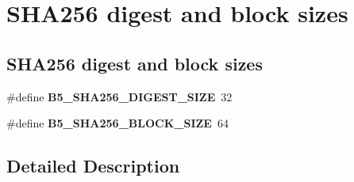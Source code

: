 \hypertarget{group__sha_size}{\section{S\-H\-A256 digest and block sizes}
\label{group__sha_size}
}
\subsection*{S\-H\-A256 digest and block sizes}
\begin{DoxyCompactItemize}
\item 
\hypertarget{group__sha_size_gae5dc0a994edcc288f44190752f534788}{\#define {\bfseries B5\-\_\-\-S\-H\-A256\-\_\-\-D\-I\-G\-E\-S\-T\-\_\-\-S\-I\-Z\-E}~32}\label{group__sha_size_gae5dc0a994edcc288f44190752f534788}

\item 
\hypertarget{group__sha_size_ga1997723ab4346f3d6e6c4b4113c75626}{\#define {\bfseries B5\-\_\-\-S\-H\-A256\-\_\-\-B\-L\-O\-C\-K\-\_\-\-S\-I\-Z\-E}~64}\label{group__sha_size_ga1997723ab4346f3d6e6c4b4113c75626}

\end{DoxyCompactItemize}


\subsection{Detailed Description}
